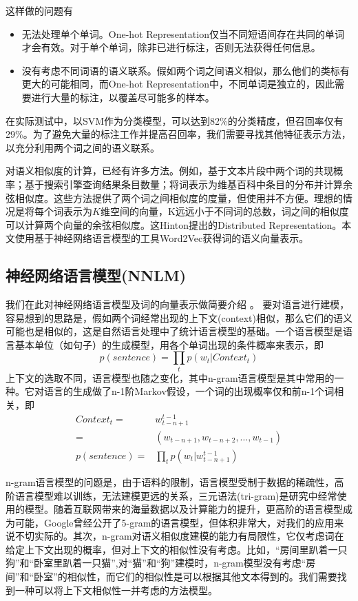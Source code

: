 这样做的问题有
\begin{itemize}
\item 无法处理单个单词。One-hot Representation仅当不同短语间存在共同的单词才会有效。对于单个单词，除非已进行标注，否则无法获得任何信息。
\item 没有考虑不同词语的语义联系。假如两个词之间语义相似，那么他们的类标有更大的可能相同，而One-hot Representation中，不同单词是独立的，因此需要进行大量的标注，以覆盖尽可能多的样本。
\end{itemize}
在实际测试中，以SVM作为分类模型，可以达到82\%的分类精度，但召回率仅有29\%。为了避免大量的标注工作并提高召回率，我们需要寻找其他特征表示方法，以充分利用两个词之间的语义联系。

对语义相似度的计算，已经有许多方法。例如，基于文本片段中两个词的共现概率\cite{jiang1997semantic}；基于搜索引擎查询结果条目数量\cite{bollegala2007measuring}；将词表示为维基百科中条目的分布并计算余弦相似度\cite{liu2009clustering}。这些方法提供了两个词之间相似度的度量，但使用并不方便。理想的情况是将每个词表示为$K$维空间的向量，K远远小于不同词的总数，词之间的相似度可以计算两个向量的余弦相似度。这Hinton提出的Distributed Representation\cite{hinton1986learning}。本文使用基于神经网络语言模型的工具Word2Vec获得词的语义向量表示。

\subsection{神经网络语言模型(NNLM)}
我们在此对神经网络语言模型及词的向量表示做简要介绍\cite{bengio2006neural} \cite{mikolov2013efficient}。 要对语言进行建模，容易想到的思路是，假如两个词经常出现的上下文(context)相似，那么它们的语义可能也是相似的，这是自然语言处理中了统计语言模型的基础。一个语言模型是语言基本单位（如句子）的生成模型，用各个单词出现的条件概率来表示，即
\[
p(sentence) = \prod\limits_t {p({w_t}|Context_t)}
\]
上下文的选取不同，语言模型也随之变化，其中n-gram语言模型是其中常用的一种。它对语言的生成做了n-1阶Markov假设，一个词的出现概率仅和前n-1个词相关，即
\begin{align*}
Context_t = & w_{t-n+1}^{t-1} \\
		= & (w_{t-n+1}, w_{t-n+2}, \ldots, w_{t-1}) \\
p(sentence) = & \prod\limits_t {p({w_t}|w_{t-n+1}^{t-1})}
\end{align*}

n-gram语言模型的问题是，由于语料的限制，语言模型受制于数据的稀疏性，高阶语言模型难以训练，无法建模更远的关系，三元语法(tri-gram)是研究中经常使用的模型。随着互联网带来的海量数据以及计算能力的提升，更高阶的语言模型成为可能，Google曾经公开了5-gram的语言模型，但体积非常大，对我们的应用来说不切实际的。其次，n-gram对语义相似度建模的能力有局限性，它仅考虑词在给定上下文出现的概率，但对上下文的相似性没有考虑。比如，``房间里趴着一只狗''和``卧室里趴着一只猫'',对``猫''和``狗''建模时，n-gram模型没有考虑``房间''和``卧室''的相似性，而它们的相似性是可以根据其他文本得到的。我们需要找到一种可以将上下文相似性一并考虑的方法模型。

